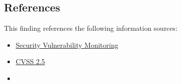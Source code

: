 \subsection*{References}

This finding references the following information sources:

\begin{itemize}
    \item \href{https://svm.cert.siemens.com/portal/}{Security Vulnerability Monitoring}
	\item \href{https://www.first.org/cvss/calculator/3.1#CVSS:3.1/AV:L/AC:H/PR:L/UI:N/S:U/C:L/I:N/A:N}{CVSS 2.5}
	\item {}
\end{itemize}


